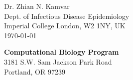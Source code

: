 


\clearpage
\begin{flushright}
  Dr. Zhian N. Kamvar\\
  Dept. of Infectious Disease Epidemiology\\
  Imperial College London, W2 1NY, UK\\
  \today
\end{flushright}

\textbf{Computational Biology Program}\\
3181 S.W. Sam Jackson Park Road\\
Portland, OR 97239




